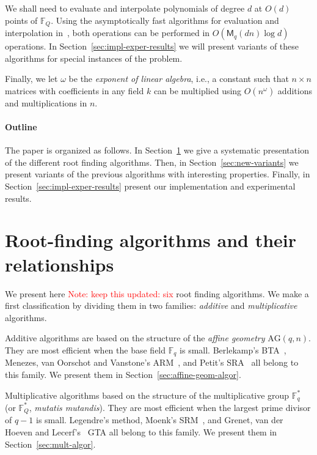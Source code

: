 \documentclass{article}
\newcommand{\ff}[1]{\mathbb{F}_{#1}}
\newcommand{\qq}{q}
\newcommand{\nn}{n}
\newcommand{\AG}{\mathrm{AG}(\qq,\nn)}
\newcommand{\Mul}{\mathsf{M}}
\newcounter{algo}
\newcommand{\Notes}[1]{\textcolor{red}{Note: #1}}
\begin{document}
We shall need to evaluate and interpolate polynomials of degree $d$ at
$O(d)$ points of $\ff{Q}$. Using the asymptotically fast algorithms
for evaluation and interpolation in~\cite[Chapter~10]{Gathen2003},
both operations can be performed in $O(\Mul_q(dn)\log d)$
operations.  In Section~\ref{sec:impl-exper-results} we will present
variants of these algorithms for special instances of the problem.

Finally, we let $ω$ be the \emph{exponent of linear algebra}, i.e., a
constant such that $n\times n$ matrices with coefficients in any field
$k$ can be multiplied using $O(n^\omega)$ additions and
multiplications in $n$.


\paragraph{Outline}
The paper is organized as follows. In
Section~\ref{sec:root-find-algor} we give a systematic presentation of
the different root finding algorithms. Then, in
Section~\ref{sec:new-variants} we present variants of the previous
algorithms with interesting properties. Finally, in
Section~\ref{sec:impl-exper-results} present our implementation and
experimental results.




\section{Root-finding algorithms and their relationships}
\label{sec:root-find-algor}

We present here \Notes{keep this updated: six} root finding
algorithms. We make a first classification by dividing them in two
families: \emph{additive} and \emph{multiplicative} algorithms.

Additive algorithms are based on the structure of the \emph{affine
  geometry} $\AG$. They are most efficient when the base field
$\ff{q}$ is small.  Berlekamp's BTA~\cite{berl70}, Menezes, van
Oorschot and Vanstone's ARM~\cite{Menvanovans92}, and Petit's
SRA~\cite{cgUCL-P14} all belong to this family.  We present them in
Section~\ref{sec:affine-geom-algor}.

Multiplicative algorithms based on the structure of the multiplicative
group $\ff{q}^\ast$ (or $\ff{Q}^\ast$, \emph{mutatis mutandis}). They
are most efficient when the largest prime divisor of $q-1$ is
small. Legendre's method, Moenk's SRM~\cite{Moenck77}, and Grenet, van
der Hoeven and Lecerf's~\cite{grenet2015deterministic} GTA all belong
to this family. We present them in Section~\ref{sec:mult-algor}.
\end{document}
